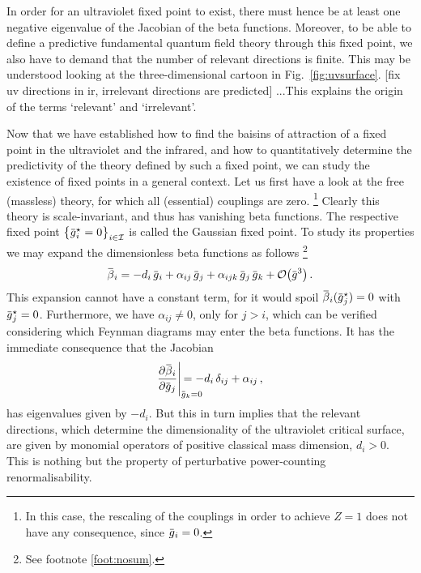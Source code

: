 \documentclass[11pt]{book}
\newcommand{\overbar}[1]{\mkern 1.5mu\overline{\mkern-1.5mu#1\mkern-1.5mu}\mkern 1.5mu}
\numberwithin{equation}{chapter}
\begin{document}
In order for an ultraviolet fixed point to exist,
there must hence be at least one negative eigenvalue
of the Jacobian of the beta functions. Moreover,
to be able to define a predictive fundamental
quantum field theory through this fixed point,
we also have to demand that the number of relevant
directions is finite. This may be understood looking
at the three-dimensional cartoon in Fig.~\ref{fig:uvsurface}.
[fix uv directions in ir, irrelevant directions are
predicted]
...This explains the origin of the terms `relevant'
and `irrelevant'.

Now that we have established how to find the baisins
of attraction of a fixed point in the ultraviolet and the infrared,
and how to quantitatively determine the predictivity
of the theory defined by such a fixed point,
we can study the existence of fixed points
in a general context.
Let us first have a look at the
free (massless) theory, for which
all (essential) couplings are zero.%
\footnote{
  In this case, the rescaling of the couplings
  in order to achieve $Z=1$ does not have any consequence,
  since $\overbar g_i = 0$.
}
Clearly this
theory is scale-invariant, and thus has vanishing
beta functions. The respective fixed point
$\big\lbrace \overbar g_i^\star = 0 \big\rbrace_{i \in \mathcal I}$
is called the Gaussian fixed point.
To study its properties we may expand the dimensionless
beta functions as follows%
\footnote{
  See footnote \ref{foot:nosum}.
}
\begin{align}
  \overbar \beta_i =
  - d_i \, \overbar g_i
  + \alpha_{ij} \, \overbar g_j
  + \alpha_{ijk} \, \overbar g_j \, \overbar g_k
  + \mathcal O \big( \overbar g^3 \big) \,.
\end{align}
This expansion cannot have a constant term, for
it would spoil
$\overbar \beta_i(\overbar g_j^\star) = 0$
with $\overbar g_j^\star = 0$.
Furthermore, we have $\alpha_{ij} \neq 0$,
only for $j>i$,
which can be verified
considering which Feynman diagrams may enter the
beta functions.
It has the immediate consequence that the Jacobian
\begin{align}
  \frac{ \partial \overbar \beta_i }{ \partial \overbar g_j}
  \Bigg|_{ \overbar g_k = 0 }
  \hspace{-7mm}
  = - d_i \, \delta_{ij} + \alpha_{ij} \,,
\end{align}
has eigenvalues given by $-d_i$.
But this in turn implies that the relevant directions,
which determine the dimensionality of the ultraviolet critical surface,
are given by monomial operators of positive classical mass dimension,
$d_i > 0$.
This is nothing but the property of perturbative power-counting renormalisability.
\end{document}
